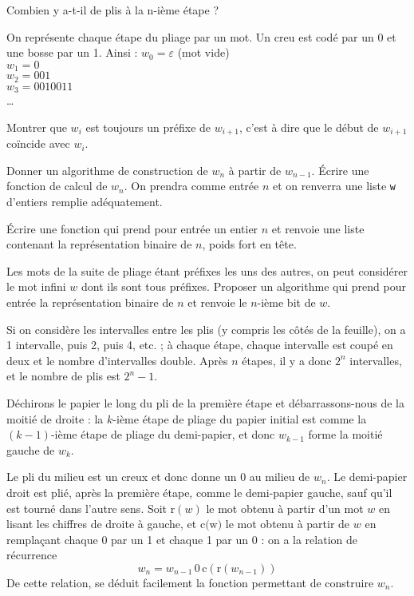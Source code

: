 \Q
Combien y a-t-il de plis à la n-ième étape ?

\Q
On représente chaque étape du pliage par un mot. Un creu est codé par un 0 et une bosse par un 1. Ainsi : $w_0=\varepsilon$ (mot vide)\\
$w_1=0$\\
$w_2=001$\\
$w_3=0010011$\\
\dots
\medskip

Montrer que $w_i$ est toujours un préfixe de $w_{i+1}$, c'est à dire que le début de $w_{i+1}$ coïncide avec $w_i$.

\Q
Donner un algorithme de construction de $w_n$ à partir de $w_{n-1}$. Écrire une fonction de calcul de $w_n$. On prendra comme entrée $n$ et on renverra une liste \texttt{w} d'entiers remplie adéquatement.

\Q
Écrire une fonction qui prend pour entrée un entier $n$ et renvoie une liste contenant la représentation binaire de $n$, poids fort en tête.

\Q
Les mots de la suite de pliage étant préfixes les uns des autres, on peut considérer le mot infini $w$ dont ils sont tous préfixes. Proposer un algorithme qui prend pour entrée la représentation binaire de $n$ et renvoie le $n$-ième bit de $w$.

\Corrige

\Q
Si on considère les intervalles entre les plis (y compris les côtés de la feuille), on a 1 intervalle, puis 2, puis 4, etc. ; à chaque étape, chaque intervalle est coupé en deux et le nombre d'intervalles double. Après $n$ étapes, il y a donc $2^n$ intervalles, et le nombre de plis est $2^n-1$.

\Q
Déchirons le papier le long du pli de la première étape et débarrassons-nous de la moitié de droite : la $k$-ième étape de pliage du papier initial est comme la $(k-1)$-ième étape de pliage du demi-papier, et donc $w_{k-1}$ forme la moitié gauche de $w_k$.

\Q
Le pli du milieu est un creux et donc donne un 0 au milieu de $w_n$. Le demi-papier droit est plié, après la première étape, comme le demi-papier gauche, sauf qu'il est tourné dans l'autre sens. Soit $\textrm{r}(w)$ le mot obtenu à partir d'un mot $w$ en lisant les chiffres de droite à gauche, et $\textrm{c(w)}$ le mot obtenu à partir de $w$ en remplaçant chaque 0 par un 1 et chaque 1 par un 0 : on a la relation de récurrence
\[
    w_n = w_{n-1}\,0\,\textrm{c}(\textrm{r}(w_{n-1}))
\]
De cette relation, se déduit facilement la fonction permettant de construire $w_n$.

